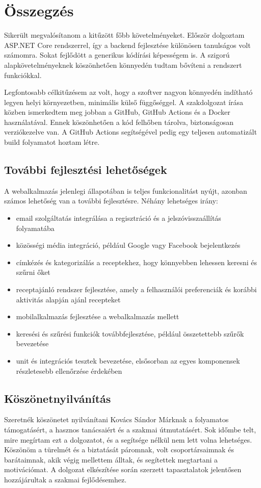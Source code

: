 ﻿\chapter{Összegzés  }\label{ch:summary}

Sikerült megvalósítanom a kitűzött főbb követelményeket. Először dolgoztam ASP.NET Core rendszerrel, így a backend fejlesztése különösen tanulságos volt számomra. Sokat fejlődött a generikus kódírási képességem is. A szigorú alapkövetelményeknek köszönhetően könnyedén tudtam bővíteni a rendszert funkciókkal.

Legfontosabb célkitűzésem az volt, hogy a szoftver nagyon könnyedén indítható legyen helyi környezetben, minimális külső függőséggel. A szakdolgozat írása közben ismerkedtem meg jobban a GitHub, GitHub Actions és a Docker használatával. Ennek köszönhetően a kód felhőben tárolva, biztonságosan verziókezelve van. A GitHub Actions segítségével pedig egy teljesen automatizált build folyamatot hoztam létre.


\section{További fejlesztési lehetőségek}

A webalkalmazás jelenlegi állapotában is teljes funkcionalitást nyújt, azonban számos lehetőség van a további fejlesztésre. Néhány lehetséges irány:
\begin{itemize}
    \item email szolgáltatás integrálása a regisztráció és a jelszóvisszaállítás folyamatába
    \item közösségi média integráció, például Google vagy Facebook bejelentkezés
    \item címkézés és kategorizálás a receptekhez, hogy könnyebben lehessen keresni és szűrni őket
    \item receptajánló rendszer fejlesztése, amely a felhasználói preferenciák és korábbi aktivitás alapján ajánl recepteket
    \item mobilalkalmazás fejlesztése a webalkalmazás mellett
    \item keresési és szűrési funkciók továbbfejlesztése, például összetettebb szűrők bevezetése
    \item unit és integrációs tesztek bevezetése, elsősorban az egyes komponensek részletesebb ellenőrzése érdekében
\end{itemize}


\section{Köszönetnyilvánítás}

Szeretnék köszönetet nyilvánítani Kovács Sándor Márknak a folyamatos támogatásért, a hasznos tanácsaiért és a szakmai útmutatásért. Sok időmbe telt, mire megírtam ezt a dolgozatot, és a segítsége nélkül nem lett volna lehetséges. Köszönöm a türelmét és a biztatását páromnak, volt csoportársaimnak és barátaimnak, akik végig mellettem álltak, és segítettek megtartani a motivációmat.
A dolgozat elkészítése során szerzett tapasztalatok jelentősen hozzájárultak a szakmai fejlődésemhez.